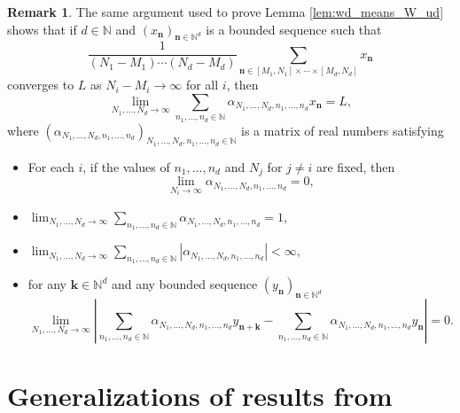 \documentclass[12pt]{article}
\theoremstyle{plain} %
\theoremstyle{definition} %
\newtheorem{remark}[theorem]{Remark}
\theoremstyle{plain}
\theoremstyle{plain}
\numberwithin{equation}{section}
\newcommand{\N}{\mathbb{N}}
\newcommand{\1}{\mathbbm{1}}
\newcommand{\oo}{\infty}
\begin{document}
\begin{remark}\label{remark:wd_means_W_ud}
    The same argument used to prove Lemma \ref{lem:wd_means_W_ud} shows that if $d\in \N$ and $(x_{\mathbf{n}})_{\mathbf{n}\in \N^{d}}$ is a bounded sequence such that 
    \begin{equation}
    \frac{1}{(N_1-M_1)\cdots (N_d-M_d)}\sum_{\mathbf{n}\in [M_1,N_1]\times\cdots \times [M_d,N_d]}x_{\mathbf{n}}
    \end{equation}
    converges to $L$ as $N_i-M_i\to\oo$ for all $i$, then 
    $$
    \lim_{N_1,\dots, N_d\to\oo} \sum_{n_1,\dots, n_d\in \N}\alpha_{N_1,\dots, N_d,n_1,\dots, n_d}x_{\mathbf{n}}=L,
    $$
    where $(\alpha_{N_1,\dots, N_d,n_1,\dots, n_d})_{N_1,\dots, N_d,n_1,\dots, n_d\in \N}$ is a matrix of real numbers satisfying 
    \begin{itemize}
        \item For each $i$, if the values of $n_1,\dots, n_d$ and $N_j$ for $j\neq i$ are fixed, then 
        $$
        \lim_{N_i \to \oo}\alpha_{N_1,\dots, N_d,n_1,\dots, n_d} = 0,
        $$
        \item $\lim_{N_1,\dots, N_d\to\oo} \sum_{n_1,\dots, n_d\in \N}\alpha_{N_1,\dots, N_d,n_1,\dots, n_d}=1$,
        \item $\lim_{N_1,\dots, N_d\to\oo} \sum_{n_1,\dots, n_d\in \N}|\alpha_{N_1,\dots, N_d,n_1,\dots, n_d}|<\oo$,
        \item for any $\mathbf{k}\in \N^d$ and any bounded sequence $(y_{\mathbf{n}})_{\mathbf{n}\in \N^d}$
        $$
        \lim_{N_1,\dots, N_d\to\oo}\left|\sum_{n_1,\dots, n_d\in \N}\alpha_{N_1,\dots, N_d,n_1,\dots, n_d}y_{\mathbf{n}+\mathbf{k}} -\sum_{n_1,\dots, n_d\in \N}\alpha_{N_1,\dots, N_d,n_1,\dots, n_d}y_{\mathbf{n}} \right|=0.
        $$
    \end{itemize}
\end{remark}



\section{Generalizations of results from \texorpdfstring{\cite{BMR24}}{[BMR24]}}\label{section:BMR_results}
\end{document}
